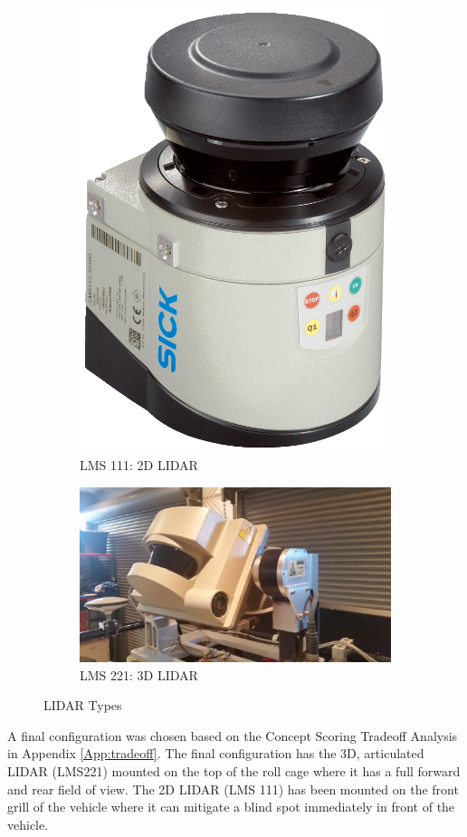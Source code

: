 \begin{figure}[H]
\centering
\begin{subfigure}{.5\textwidth}
  \centering
  \includegraphics[height=.5\linewidth]{LMS111}
  \caption{LMS 111: 2D LIDAR}
  \label{fig:lms111A}
\end{subfigure}%
\begin{subfigure}{.5\textwidth}
  \centering
  \includegraphics[height=.5\linewidth]{LMS221}
  \caption{LMS 221: 3D LIDAR}
  \label{fig:lms221A}
\end{subfigure}
\caption{LIDAR Types}
\end{figure}

A final configuration was chosen based on the Concept Scoring Tradeoff Analysis in Appendix \ref{App:tradeoff}. The final configuration has the 3D, articulated LIDAR (LMS221) mounted on the top of the roll cage where it has a full forward and rear field of view. The 2D LIDAR (LMS 111) has been mounted on the front grill of the vehicle where it can mitigate a blind spot immediately in front of the vehicle. 

